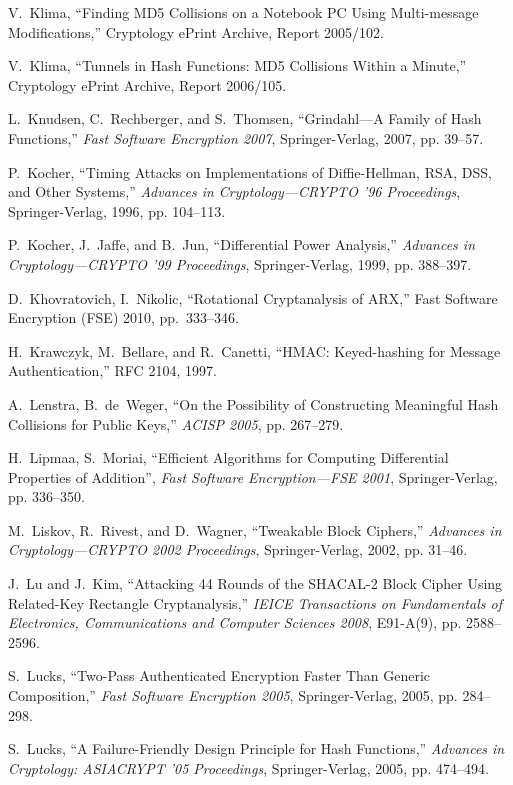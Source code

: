 \documentclass[11pt,twoside]{article}
\begin{document}
{\begin{thebibliography}{19}
 V.~Klima, ``Finding MD5 Collisions on a Notebook PC Using Multi-message Modifications,'' Cryptology ePrint Archive, Report 2005/102.

 V.~Klima, ``Tunnels in Hash Functions: MD5 Collisions Within a Minute,'' Cryptology ePrint Archive, Report 2006/105.

 L.~Knudsen, C.~Rechberger, and S.~Thomsen, ``Grindahl---A Family of Hash Functions,''  {\it Fast Software Encryption 2007}, Springer-Verlag, 2007, pp. 39--57.

 P.~Kocher, ``Timing Attacks on Implementations of Diffie-Hellman, RSA, DSS, and Other Systems,'' {\it Advances in Cryptology---CRYPTO '96 Proceedings}, Springer-Verlag, 1996, pp. 104--113.

 P.~Kocher, J.~Jaffe, and B.~Jun, ``Differential Power Analysis,'' {\it Advances in Cryptology---CRYPTO '99 Proceedings}, Springer-Verlag, 1999, pp. 388--397.


 D.~Khovratovich, I.~Nikolic, ``Rotational Cryptanalysis of
  ARX,'' Fast Software Encryption (FSE) 2010, pp.~333--346. 


 H.~Krawczyk, M.~Bellare, and R.~Canetti, ``{HMAC}: Keyed-hashing for Message Authentication,'' RFC 2104, 1997.

 A.~Lenstra, B.~de~Weger, ``On the Possibility of Constructing Meaningful Hash Collisions for Public Keys,'' {\it ACISP 2005}, pp. 267--279.

 H.~Lipmaa, S.~Moriai, ``Efficient Algorithms for Computing Differential Properties
of Addition'', {\it Fast Software Encryption---FSE 2001}, Springer-Verlag, pp. 336--350. 

 M.~Liskov, R.~Rivest, and D.~Wagner, ``Tweakable Block Ciphers,'' {\it Advances in Cryptology---CRYPTO 2002 Proceedings}, Springer-Verlag, 2002, pp. 31--46.

 J.~Lu and J.~Kim, ``Attacking 44 Rounds of the SHACAL-2 Block Cipher Using Related-Key Rectangle Cryptanalysis,'' {\it IEICE Transactions on Fundamentals of Electronics, Communications and Computer Sciences 2008}, E91-A(9), pp. 2588--2596.

  S.~Lucks, ``Two-Pass Authenticated Encryption Faster Than Generic Composition,'' {\it Fast Software Encryption 2005}, Springer-Verlag, 2005, pp. 284--298.

 S.~Lucks, ``A Failure-Friendly Design Principle for Hash Functions,'' {\it Advances in Cryptology: ASIACRYPT '05 Proceedings}, Springer-Verlag, 2005, pp. 474--494.


\end{thebibliography}}
\end{document}
